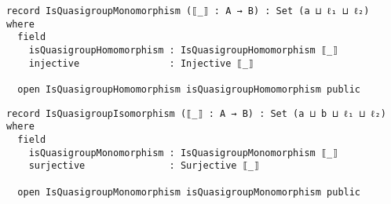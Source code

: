 \begin{comment}
    ∙-isMagmaHomomorphism : ∙.IsMagmaHomomorphism ⟦_⟧
    ∙-isMagmaHomomorphism = record
      \{ isRelHomomorphism = isRelHomomorphism
      ; homo = ∙-homo
      \}

    \textbackslash\textbackslash-isMagmaHomomorphism : \textbackslash\textbackslash.IsMagmaHomomorphism ⟦_⟧
    \textbackslash\textbackslash-isMagmaHomomorphism = record
      \{ isRelHomomorphism  = isRelHomomorphism
      ; homo = \textbackslash\textbackslash-homo
      \}

    //-isMagmaHomomorphism : //.IsMagmaHomomorphism ⟦_⟧
    //-isMagmaHomomorphism = record
      \{ isRelHomomorphism  = isRelHomomorphism
      ; homo = //-homo
      \}
\end{comment}

\begin{verbatim}
record IsQuasigroupMonomorphism (⟦_⟧ : A → B) : Set (a ⊔ ℓ₁ ⊔ ℓ₂) where
  field
    isQuasigroupHomomorphism : IsQuasigroupHomomorphism ⟦_⟧
    injective                : Injective ⟦_⟧

  open IsQuasigroupHomomorphism isQuasigroupHomomorphism public
\end{verbatim}
\begin{comment}

    ∙-isMagmaMonomorphism   : ∙.IsMagmaMonomorphism ⟦_⟧
    ∙-isMagmaMonomorphism   = record
      \{ isMagmaHomomorphism = ∙-isMagmaHomomorphism
      ; injective           = injective
      \}

    \textbackslash\textbackslash-isMagmaMonomorphism  : \textbackslash\textbackslash.IsMagmaMonomorphism ⟦_⟧
    \textbackslash\textbackslash-isMagmaMonomorphism  = record
      \{ isMagmaHomomorphism = \textbackslash\textbackslash-isMagmaHomomorphism
      ; injective                   = injective
      \}

    //-isMagmaMonomorphism  : //.IsMagmaMonomorphism ⟦_⟧
    //-isMagmaMonomorphism  = record
      \{ isMagmaHomomorphism = //-isMagmaHomomorphism
      ; injective           = injective
      \}

    open //.IsMagmaMonomorphism //-isMagmaMonomorphism public
      using (isRelMonomorphism)

\end{comment}
\begin{verbatim}
record IsQuasigroupIsomorphism (⟦_⟧ : A → B) : Set (a ⊔ b ⊔ ℓ₁ ⊔ ℓ₂) where
  field
    isQuasigroupMonomorphism : IsQuasigroupMonomorphism ⟦_⟧
    surjective               : Surjective ⟦_⟧

  open IsQuasigroupMonomorphism isQuasigroupMonomorphism public
\end{verbatim}
